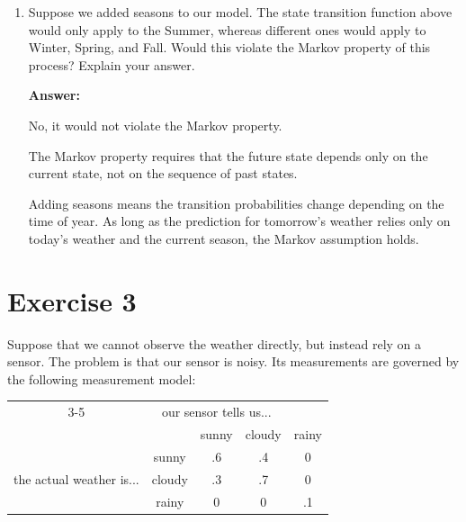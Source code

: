 \documentclass{article}
\begin{document}
\begin{enumerate}
    \item[(g)] Suppose we added seasons to our model. The state transition function above would only apply to the Summer, whereas different ones would apply to Winter, Spring, and Fall. Would this violate the Markov property of this process? Explain your answer.

    \textbf{Answer:}

    No, it would not violate the Markov property.

    The Markov property requires that the future state depends only on the current state, not on the sequence of past states.

    Adding seasons means the transition probabilities change depending on the time of year. As long as the prediction for tomorrow's weather relies only on today's weather and the current season, the Markov assumption holds.

\end{enumerate}

\section*{Exercise 3}

Suppose that we cannot observe the weather directly, but instead rely on a sensor.
The problem is that our sensor is noisy. Its measurements are governed by the following measurement model:

\begin{center}
\begin{tabular}{|cc|ccc|}
\cline{3-5}
 \multicolumn{2}{c|}{} & \multicolumn{3}{c|}{our sensor tells us...} \\
 \multicolumn{2}{c|}{} & sunny & cloudy & rainy \\
\hline
\multirow{3}{*}{the actual weather is...}
& sunny  & .6 & .4 & 0 \\
& cloudy & .3 & .7 & 0 \\
& rainy  & 0 & 0 & .1 \\
\hline
\end{tabular}
\end{center}
\end{document}
